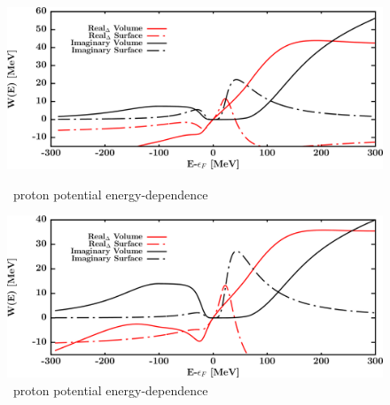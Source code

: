 \begin{figure}[H]
    \centering
    \begin{minipage}{0.45\textwidth}
        \centering
        \includegraphics[width=1.0\textwidth]{figures/ca48_protonPotentials.png}
        \caption{\caEight\ proton potential energy-dependence}
        \label{DOMFitData_ca48_proton_potentialComponent_energy}
    \end{minipage}\hfill
    \begin{minipage}{0.45\textwidth}
        \centering
        \includegraphics[width=1.0\textwidth]{figures/ca48_neutronPotentials.png}
        \caption{\caEight\ proton potential energy-dependence}
        \label{DOMFitData_ca48_neutron_potentialComponent_energy}
    \end{minipage}
\end{figure}


